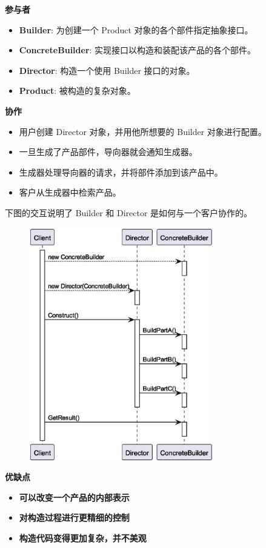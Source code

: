 \noindent\textbf{参与者}

\begin{itemize}
    \item \textbf{Builder}: 为创建一个 Product 对象的各个部件指定抽象接口。
    \item \textbf{ConcreteBuilder}: 实现接口以构造和装配该产品的各个部件。
    \item \textbf{Director}: 构造一个使用 Builder 接口的对象。
    \item \textbf{Product}: 被构造的复杂对象。
\end{itemize}

\noindent\textbf{协作}
\begin{itemize}
    \item 用户创建 Director 对象，并用他所想要的 Builder 对象进行配置。
    \item 一旦生成了产品部件，导向器就会通知生成器。
    \item 生成器处理导向器的请求，并将部件添加到该产品中。
    \item 客户从生成器中检索产品。
\end{itemize}

下图的交互说明了 Builder 和 Director 是如何与一个客户协作的。

\begin{figure}[H] 
    \centering 
    \includegraphics[width=8cm]{figures/Builder.eps} 
\end{figure}

\noindent\textbf{优缺点}
\begin{itemize}
    \item \textbf{可以改变一个产品的内部表示}
    \item \textbf{对构造过程进行更精细的控制}
    \item \textbf{构造代码变得更加复杂，并不美观}
\end{itemize}

